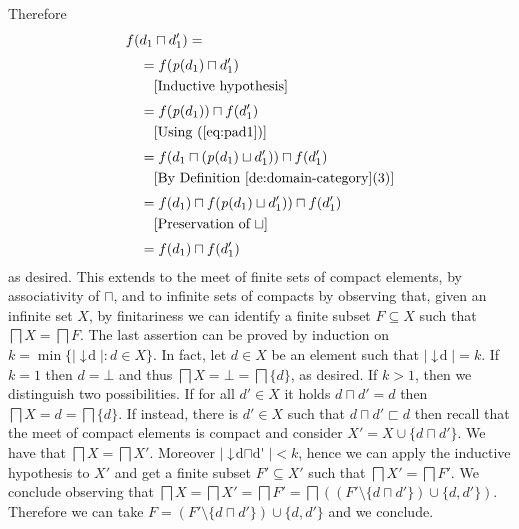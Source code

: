 \documentclass[conference]{IEEEtran}
\renewenvironment{proof}{\begin{IEEEproof}}{\end{IEEEproof}}
\newcommand{\principal}[1]{\ensuremath{\mathop{\downarrow\!{#1}}}}
\newcommand{\pred}[1]{\ensuremath{\mathit{p}({#1})}}
\begin{document}
\begin{proof}
  Therefore
  \begin{align*}
    & f(d_1 \sqcap d_1') =\\[1mm]
    & \quad = f(\pred{d_1} \sqcap d_1')\\
    & \qquad \mbox{[Inductive hypothesis]}\\[1mm]
    & \quad =f(\pred{d_1}) \sqcap f(d_1')\\
    & \qquad \mbox{[Using~(\ref{eq:pad1})]}\\[1mm]
    & \quad = f(d_1 \sqcap (\pred{d_1} \sqcup d_1')) \sqcap f(d_1')\\
    & \qquad \mbox{[By Definition~\ref{de:domain-category}(3)]}\\[1mm]
    & \quad = f(d_1) \sqcap f(\pred{d_1} \sqcup d_1')) \sqcap f(d_1')\\
    & \qquad \mbox{[Preservation of $\sqcup$]}\\[1mm]
    & \quad = f(d_1) \sqcap f(d_1')
  \end{align*}
  as desired. This extends to the meet of finite sets of compact elements, by
  associativity of $\sqcap$, and to 
  infinite sets of compacts by observing that, given an infinite set
  $X$, by finitariness we can identify a finite subset $F \subseteq X$
  such that $\bigsqcap X = \bigsqcap F$.
  The last assertion can be proved by induction on
  $k = \min \{ |\principal{d}| : d \in X \}$. In fact, let $d \in X$
  be an element such that $|\principal{d}| = k$. If {$k=1$} then
  $d = \bot$ and thus $\bigsqcap X = \bot = \bigsqcap \{ d \}$, as
  desired. If {$k >1$}, then we distinguish two possibilities. If for
  all $d' \in X$ it holds $d \sqcap d' = d$ then
  $\bigsqcap X = d = \bigsqcap \{d\}$. If instead, there is $d' \in X$
  such that $d \sqcap d' \sqsubset d$ then recall that the meet of
  compact elements is compact and consider
  $X' = X \cup \{ d \sqcap d' \}$. We have that
  $\bigsqcap X = \bigsqcap X'$. Moreover
  $|\principal{d \sqcap d'}| < k$, hence we can apply the inductive
  hypothesis to $X'$ and get a finite subset $F' \subseteq X'$ such
  that $\bigsqcap X' = \bigsqcap F'$. We conclude observing that
  $\bigsqcap X = \bigsqcap X' = \bigsqcap F' = \bigsqcap ((F'
  \setminus \{d \sqcap d'\}) \cup \{ d, d'\})$. Therefore we can take
  $F = (F' \setminus \{d \sqcap d'\}) \cup \{ d, d'\}$ and we
  conclude.
\end{proof}




\end{document}
